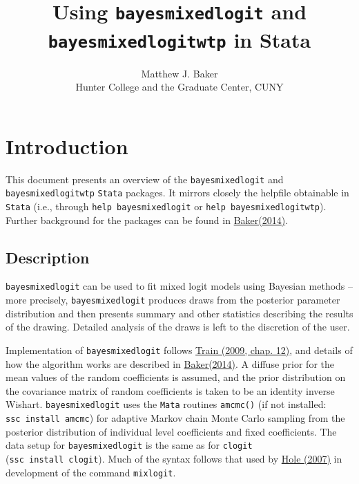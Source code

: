 \documentclass[11pt]{article}
\title{Using \texttt{bayesmixedlogit} and \texttt{bayesmixedlogitwtp} in Stata}
\author{Matthew J. Baker \\ Hunter College and the Graduate Center, CUNY}
\begin{document}
    
    \maketitle
    
    

    
    \hypertarget{using-bayesmixedlogit-and-bayesmixedlogitwtp-in-stata}{%
\section{\texorpdfstring{Introduction}{Using bayesmixedlogit and bayesmixedlogitwtp in Stata}}\label{using-bayesmixedlogit-and-bayesmixedlogitwtp-in-stata}}

This document presents an overview of the \texttt{bayesmixedlogit} and
\texttt{bayesmixedlogitwtp} \texttt{Stata} packages. It mirrors closely
the helpfile obtainable in \texttt{Stata} (i.e., through
\texttt{help\ bayesmixedlogit} or \texttt{help\ bayesmixedlogitwtp}).
Further background for the packages can be found in
\href{https://www.stata-journal.com/article.html?article=st0354}{Baker(2014)}.

    \hypertarget{description}{%
\subsection{Description}\label{description}}

\texttt{bayesmixedlogit} can be used to fit mixed logit models using
Bayesian methods -- more precisely, \texttt{bayesmixedlogit} produces
draws from the posterior parameter distribution and then presents
summary and other statistics describing the results of the drawing.
Detailed analysis of the draws is left to the discretion of the user.

Implementation of \texttt{bayesmixedlogit} follows
\href{https://eml.berkeley.edu/books/choice2.html}{Train (2009, chap.
12)}, and details of how the algorithm works are described in
\href{https://www.stata-journal.com/article.html?article=st0354}{Baker(2014)}.
A diffuse prior for the mean values of the random coefficients is
assumed, and the prior distribution on the covariance matrix of random
coefficients is taken to be an identity inverse Wishart.
\texttt{bayesmixedlogit} uses the \texttt{Mata} routines
\texttt{amcmc()} (if not installed: \texttt{ssc\ install\ amcmc}) for
adaptive Markov chain Monte Carlo sampling from the posterior
distribution of individual level coefficients and fixed coefficients.
The data setup for \texttt{bayesmixedlogit} is the same as for
\texttt{clogit} (\texttt{ssc\ install\ clogit}). Much of the syntax
follows that used by
\href{https://www.stata-journal.com/article.html?article=st0133}{Hole
(2007)} in development of the command \texttt{mixlogit}.
\end{document}
